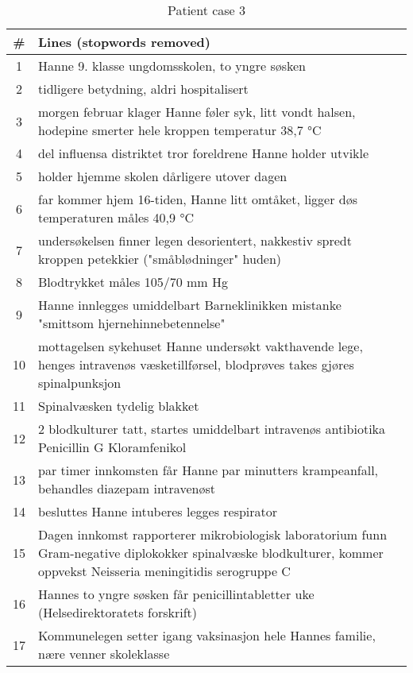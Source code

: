\begin{table}[htbp] \footnotesize \center
\caption[]{Patient case 3\label{tab:case3}}
\begin{tabularx}{\textwidth}{c X}
    \toprule
    \# & Lines (stopwords removed) \\
    \midrule
    1 & Hanne 9. klasse ungdomsskolen, to yngre søsken \\
    2 & tidligere betydning, aldri hospitalisert \\
    3 & morgen februar klager Hanne føler syk, litt vondt halsen, hodepine smerter hele kroppen temperatur 38,7 °C \\
    4 & del influensa distriktet tror foreldrene Hanne holder utvikle \\
    5 & holder hjemme skolen dårligere utover dagen \\
    6 & far kommer hjem 16-tiden, Hanne litt omtåket, ligger døs temperaturen måles 40,9 °C \\
    7 & undersøkelsen finner legen desorientert, nakkestiv spredt kroppen petekkier ("småblødninger" huden) \\
    8 & Blodtrykket måles 105/70 mm Hg \\
    9 & Hanne innlegges umiddelbart Barneklinikken mistanke "smittsom hjernehinnebetennelse" \\
    10 & mottagelsen sykehuset Hanne undersøkt vakthavende lege, henges intravenøs væsketillførsel, blodprøves takes gjøres spinalpunksjon \\
    11 & Spinalvæsken tydelig blakket \\
    12 & 2 blodkulturer tatt, startes umiddelbart intravenøs antibiotika Penicillin G Kloramfenikol \\
    13 & par timer innkomsten får Hanne par minutters krampeanfall, behandles diazepam intravenøst \\
    14 & besluttes Hanne intuberes legges respirator \\
    15 & Dagen innkomst rapporterer mikrobiologisk laboratorium funn Gram-negative diplokokker spinalvæske blodkulturer, kommer oppvekst Neisseria meningitidis serogruppe C \\
    16 & Hannes to yngre søsken får penicillintabletter uke (Helsedirektoratets forskrift) \\
    17 & Kommunelegen setter igang vaksinasjon hele Hannes familie, nære venner skoleklasse \\
    \bottomrule
\end{tabularx}
\end{table}

